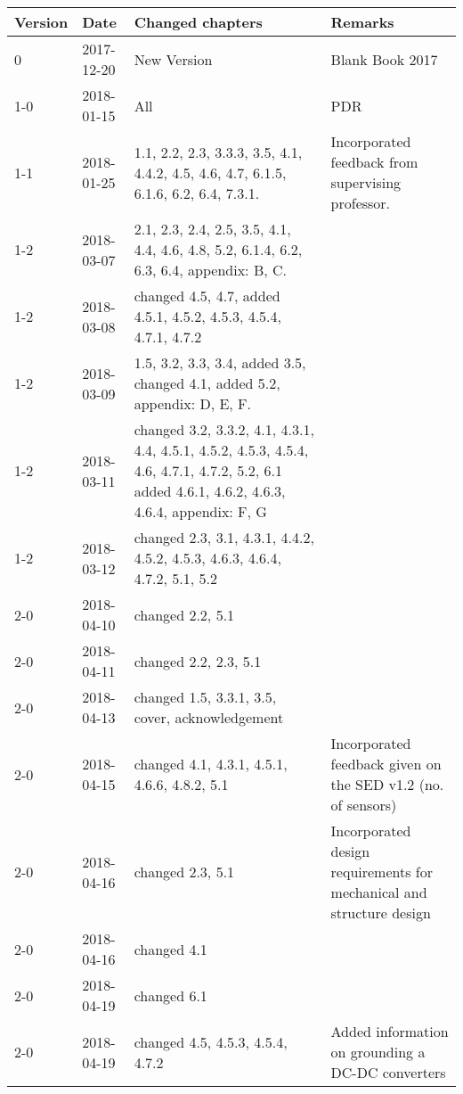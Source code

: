 \begin{longtable}{|p{}| p{} |p{} |p{}|}\hline
    \centering
    \textbf{Version}    & \textbf{Date}     & \textbf{Changed chapters} & \textbf{Remarks} \\\hline
    0       &   2017-12-20   & New Version   & Blank Book 2017  \\\hline
    1-0     &   2018-01-15   & All           & PDR \\\hline 
    1-1     &   2018-01-25   & 1.1, 2.2, 2.3, 3.3.3, 3.5, 4.1, 4.4.2, 4.5, 4.6, 4.7, 6.1.5, 6.1.6, 6.2, 6.4, 7.3.1. & Incorporated feedback from supervising professor.\\\hline 
    1-2     &   2018-03-07   & 2.1, 2.3, 2.4, 2.5, 3.5, 4.1, 4.4, 4.6, 4.8, 5.2, 6.1.4, 6.2, 6.3, 6.4, appendix: B, C.     &    \\\hline 
    1-2     &   2018-03-08   & changed 4.5, 4.7, added 4.5.1, 4.5.2, 4.5.3, 4.5.4, 4.7.1, 4.7.2     &    \\\hline
    1-2     &   2018-03-09   & 1.5, 3.2, 3.3, 3.4, added 3.5, changed 4.1, added 5.2,  appendix: D, E, F.     & \\\hline 
    1-2     &   2018-03-11   & changed 3.2, 3.3.2, 4.1, 4.3.1, 4.4, 4.5.1, 4.5.2, 4.5.3, 4.5.4, 4.6, 4.7.1, 4.7.2, 5.2, 6.1 added 4.6.1, 4.6.2, 4.6.3, 4.6.4, appendix: F, G &    \\\hline 
    1-2     &   2018-03-12   & changed 2.3, 3.1, 4.3.1, 4.4.2, 4.5.2, 4.5.3, 4.6.3, 4.6.4, 4.7.2, 5.1, 5.2 & \\\hline 
    2-0     &   2018-04-10   & changed 2.2, 5.1 & \\\hline 
    2-0     &   2018-04-11   & changed 2.2, 2.3, 5.1 & \\\hline 
    2-0     &   2018-04-13   & changed 1.5, 3.3.1, 3.5, cover, acknowledgement &\\\hline 
    2-0     &   2018-04-15   & changed 4.1, 4.3.1, 4.5.1, 4.6.6, 4.8.2, 5.1 & Incorporated feedback given on the SED v1.2 (no. of sensors)\\\hline
    2-0     &   2018-04-16   & changed 2.3, 5.1 & Incorporated design requirements for mechanical and structure design\\\hline 
    2-0     &   2018-04-16   & changed 4.1 & \\\hline
    2-0     &   2018-04-19   & changed 6.1 & \\\hline
    2-0     &   2018-04-19   & changed 4.5, 4.5.3, 4.5.4, 4.7.2 & Added information on grounding a DC-DC converters \\\hline

\end{longtable}
